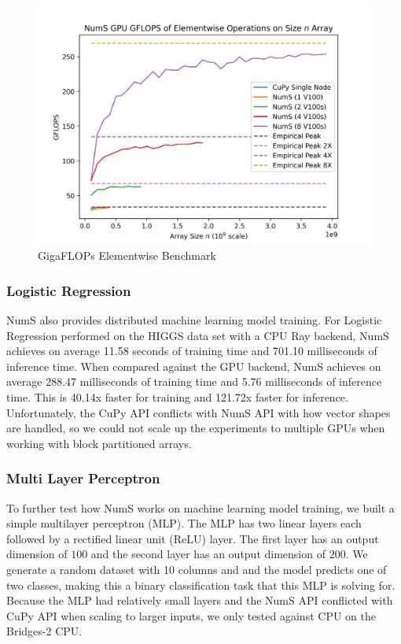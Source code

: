 \documentclass{article}
\begin{document}
\begin{figure}
	\centerline{\includegraphics[width=5in]{figures/NumS_GPU_GFLOPS_elementwise.png}}
	\caption{GigaFLOPs Elementwise Benchmark}
	\label{fig:elementwise}
\end{figure}

\subsubsection{Logistic Regression}
NumS also provides distributed machine learning model training. For Logistic Regression performed on the HIGGS data set with a CPU Ray backend, NumS achieves on average 11.58 seconds of training time and 701.10 milliseconds of inference time. When compared against the GPU backend, NumS achieves on average 288.47 milliseconds of training time and 5.76 milliseconds of inference time. This is 40.14x faster for training and 121.72x faster for inference. Unfortunately, the CuPy API conflicts with NumS API with how vector shapes are handled, so we could not scale up the experiments to multiple GPUs when working with block partitioned arrays.

\subsubsection{Multi Layer Perceptron}
To further test how NumS works on machine learning model training, we built a simple multilayer perceptron (MLP). The MLP has two linear layers each followed by a rectified linear unit (ReLU) layer. The first layer has an output dimension of $100$ and the second layer has an output dimension of $200$. We generate a random dataset with 10 columns and and the model predicts one of two classes, making this a binary classification task that this MLP is solving for. Because the MLP had relatively small layers and the NumS API conflicted with CuPy API when scaling to larger inputs, we only tested against CPU on the Bridges-2 CPU.
\end{document}
